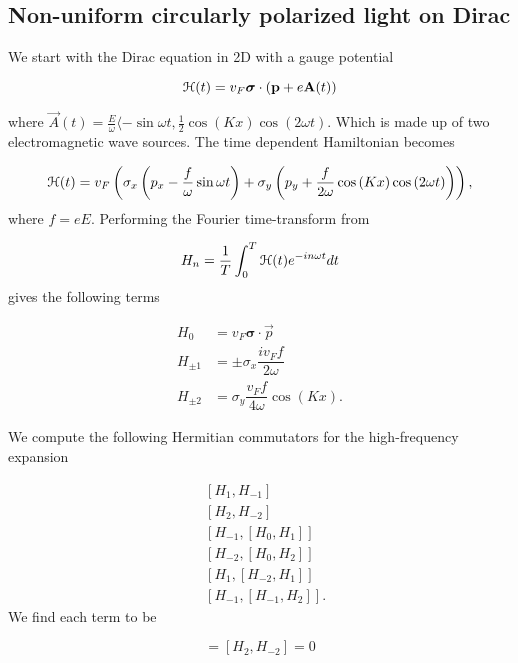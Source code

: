 \subsection{Non-uniform circularly polarized light on Dirac}
We start with the Dirac equation in 2D with a gauge potential

\begin{equation}
  \mathcal{H}(t) = v_{F} \bm{\sigma} \cdot \left(\mathbf{p}+e\mathbf{A}(t)\right)
\end{equation}

where $\vec{A}(t) = \tfrac{E}{\omega} \langle -\sin{\omega t}, \tfrac{1}{2} \cos{(Kx)} \cos{(2\omega t)}$.
Which is made up of two electromagnetic wave sources.
The time dependent Hamiltonian becomes

\begin{equation}
  \mathcal{H}(t) = v_{F} \left( \sigma_x \left(p_x - \dfrac{f}{\omega} \sin{\omega t} \right) + \sigma_y \left(p_y + \dfrac{f}{2\omega} \cos{(Kx)} \cos{(2\omega t)} \right) \right),
\end{equation}
where $f = eE$.
Performing the Fourier time-transform from

\begin{equation}
  H_n = \dfrac{1}{T} \int_{0}^{T} \mathcal{H}(t) e^{-in\omega t} dt
\end{equation}
gives the following terms

\begin{align}
  H_0 &= v_{F} \bm{\sigma}\cdot \vec{p} \\
  H_{\pm1} &= \pm \sigma_x \dfrac{i v_{F} f}{2\omega} \\
  H_{\pm2} &= \sigma_y \dfrac{v_{F} f}{4\omega} \cos{(Kx)}.
\end{align}

We compute the following Hermitian commutators for the high-frequency expansion

\begin{align}
  &[H_{1}, H_{-1}] \\
  &[H_{2}, H_{-2}] \\
  &[H_{-1}, [H_{0}, H_{1}]] \\
  &[H_{-2}, [H_{0}, H_{2}]] \\
  &[H_{1}, [H_{-2}, H_{1}]] \\
  &[H_{-1}, [H_{-1}, H_{2}]].
\end{align}
We find each term to be

\begin{equation}
  [H_{1}, H_{-1}] = [H_{2}, H_{-2}] = 0
\end{equation}


